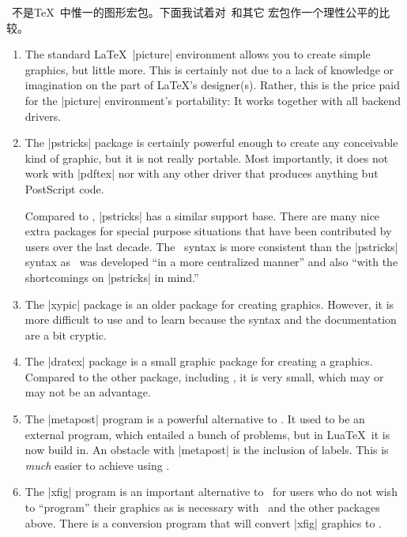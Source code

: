 \tikzname\ 不是\TeX\ 中惟一的图形宏包。下面我试着对\tikzname\ 和其它
宏包作一个理性公平的比较。

\begin{enumerate}
\item
  The standard \LaTeX\ |{picture}| environment allows you to create
  simple graphics, but little more. This is certainly not
  due to a lack of knowledge or imagination on the part of
  \LaTeX's designer(s). Rather, this is the price paid for the
  |{picture}| environment's portability: It works together with all
  backend drivers.
\item
  The |pstricks| package is certainly powerful enough to create
  any conceivable kind of graphic, but it is not really portable. Most
  importantly, it does not work with |pdftex| nor with any other
  driver that produces anything but PostScript code.

  Compared to \tikzname, |pstricks| has a similar support base. There
  are many nice extra packages for special purpose situations that have
  been contributed by users over the last decade.
  The \tikzname\ syntax is more consistent than the |pstricks| syntax
  as \tikzname\ was developed ``in a more centralized manner'' and
  also ``with the shortcomings on |pstricks| in mind.''
\item
  The |xypic| package is an older package for creating
  graphics. However, it is more difficult to use and to learn because
  the syntax and the documentation are a bit cryptic.
\item
  The |dratex| package is a small graphic package for creating a
  graphics. Compared to the other package, including \tikzname, it is
  very small, which may or may not be an advantage.
\item
  The |metapost| program is a powerful alternative to
  \tikzname. It used to be an external program, which entailed a
  bunch of problems, but in Lua\TeX\ it is now build in. An obstacle
  with |metapost| is the inclusion of labels. This is \emph{much}
  easier to achieve using \pgfname. 
\item
  The |xfig| program is an important alternative to \tikzname\ for
  users who do not wish to ``program'' their graphics as is necessary
  with \tikzname\ and the other packages above. There is a conversion
  program that will convert |xfig| graphics to \tikzname.
\end{enumerate}


